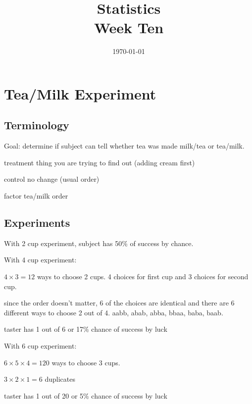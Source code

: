 \documentclass[landscape]{exam}
\title{Statistics \\ Week Ten}
\date{\today}
\author{}
\begin{document}
  \maketitle
  \tableofcontents

  \section{Tea/Milk Experiment}

  \subsection{Terminology}
  
  Goal: determine if subject can tell whether tea was made milk/tea or tea/milk.

  \begin{description*}
    \item[treatment] thing you are trying to find out (adding cream first)
    \item[control] no change (usual order)
    \item[factor] tea/milk order
  \end{description*}

  \subsection{Experiments}
  With 2 cup experiment, subject has 50\% of success by chance.

  With 4 cup experiment:
  \begin{itemize*}
    \item $4 \times 3 = 12$ ways to choose 2 cups.  4 choices for first cup and
      3 choices for second cup.  
    \item since the order doesn't matter, 6 of the choices are identical and
      there are 6 different ways to choose 2 out of 4. aabb, abab, abba, bbaa,
      baba, baab.
    \item taster has 1 out of 6 or 17\% chance of success by luck
  \end{itemize*}

  With 6 cup experiment:
  \begin{itemize*}
    \item $6 \times 5 \times 4 = 120$ ways to choose 3 cups.  
    \item $3 \times 2 \times 1 = 6$ duplicates
    \item taster has 1 out of 20 or 5\% chance of success by luck
  \end{itemize*}
\end{document}
